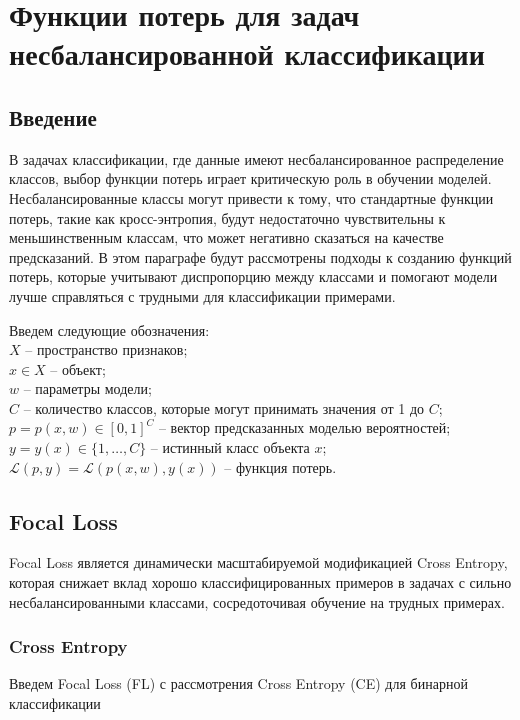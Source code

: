 \section*{Функции потерь для задач несбалансированной классификации}

\subsection*{Введение}

В задачах классификации, где данные имеют несбалансированное распределение классов, выбор функции потерь играет критическую роль в обучении моделей. Несбалансированные классы могут привести к тому, что стандартные функции потерь, такие как кросс-энтропия, будут недостаточно чувствительны к меньшинственным классам, что может негативно сказаться на качестве предсказаний. В этом параграфе будут рассмотрены подходы к созданию функций потерь, которые учитывают диспропорцию между классами и помогают модели лучше справляться с трудными для классификации примерами.

Введем следующие обозначения:
\\\indent $X$ -- пространство признаков;
\\\indent $x \in X$ -- объект;
\\\indent $w$ -- параметры модели;
\\\indent $C$ -- количество классов, которые могут принимать значения от 1 до $C$;
\\\indent $p=p(x,w) \in [0, 1]^C$ -- вектор предсказанных моделью вероятностей;
\\\indent $y=y(x) \in \{1,\ldots,C\}$ -- истинный класс объекта $x$;
\\\indent $\mathcal{L}(p,y) = \mathcal{L}(p(x, w), y(x))$ -- функция потерь.

\subsection*{Focal Loss}

Focal Loss является динамически масштабируемой модификацией Cross Entropy, которая снижает вклад хорошо классифицированных примеров в задачах с сильно несбалансированными классами, сосредоточивая обучение на трудных примерах.

\subsubsection*{Cross Entropy}

Введем Focal Loss (FL) с рассмотрения Cross Entropy (CE) для бинарной классификации

